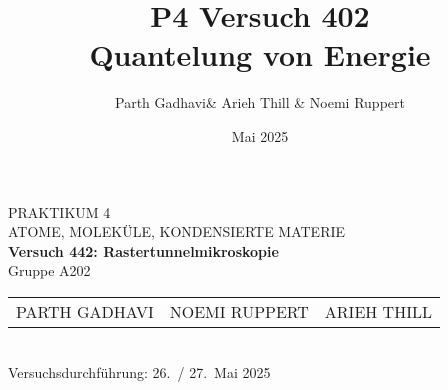 \documentclass[ngerman,12pt,a4paper]{report}
\title{P4 Versuch 402 \\[1ex] \large Quantelung von Energie}
\author{Parth Gadhavi\& Arieh Thill \& Noemi Ruppert}
\date{Mai 2025}
\begin{document}
\begin{titlepage}
  \centering
  \vspace*{2cm}
  
  {\Large PRAKTIKUM 4}\\[0.5cm]
  {\large ATOME, MOLEKÜLE, KONDENSIERTE MATERIE}\\[1cm]
  
  {\LARGE\bfseries Versuch 442: Rastertunnelmikroskopie}\\[1cm]
  
  Gruppe A202\\[1cm]
  
  \begin{tabular}{lll}
    PARTH GADHAVI   & NOEMI RUPPERT   & ARIEH THILL \\
  \end{tabular}\\[2cm]
  
  Versuchsdurchführung: 26.~/ 27.~Mai 2025
  
  \vfill
\end{titlepage}

\tableofcontents
\clearpage
\clearpage
\setcounter{page}{1}
 
 
 
 
 
 
 

\appendix
\printbibliography{}
\listoffigures{}
\listoftables{}
 
\end{document}
